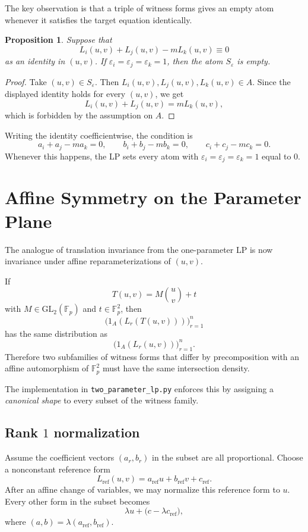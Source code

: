 \documentclass[11pt]{article}
\newtheorem{proposition}{Proposition}
\begin{document}
The key observation is that a triple of witness forms gives an empty atom whenever
it satisfies the target equation identically.

\begin{proposition}
Suppose that
\[
L_i(u,v)+L_j(u,v)-mL_k(u,v)\equiv 0
\]
as an identity in $(u,v)$. If $\varepsilon_i=\varepsilon_j=\varepsilon_k=1$,
then the atom $S_{\varepsilon}$ is empty.
\end{proposition}

\begin{proof}
Take $(u,v) \in S_{\varepsilon}$. Then $L_i(u,v),L_j(u,v),L_k(u,v)\in A$.
Since the displayed identity holds for every $(u,v)$, we get
\[
L_i(u,v)+L_j(u,v)=mL_k(u,v),
\]
which is forbidden by the assumption on $A$.
\end{proof}

Writing the identity coefficientwise, the condition is
\[
a_i+a_j-ma_k=0,\qquad
b_i+b_j-mb_k=0,\qquad
c_i+c_j-mc_k=0.
\]
Whenever this happens, the LP sets every atom with
$\varepsilon_i=\varepsilon_j=\varepsilon_k=1$ equal to $0$.

\section{Affine Symmetry on the Parameter Plane}

The analogue of translation invariance from the one-parameter LP is now invariance
under affine reparameterizations of $(u,v)$.

If
\[
T(u,v)=M\binom{u}{v}+t
\]
with $M \in \mathrm{GL}_2(\mathbb{F}_p)$ and $t \in \mathbb{F}_p^2$, then
\[
\bigl(1_A(L_r(T(u,v)))\bigr)_{r=1}^n
\]
has the same distribution as
\[
\bigl(1_A(L_r(u,v))\bigr)_{r=1}^n.
\]
Therefore two subfamilies of witness forms that differ by precomposition with an
affine automorphism of $\mathbb{F}_p^2$ must have the same intersection density.

The implementation in \texttt{two\_parameter\_lp.py} enforces this by assigning a
\emph{canonical shape} to every subset of the witness family.

\subsection*{Rank $1$ normalization}

Assume the coefficient vectors $(a_r,b_r)$ in the subset are all proportional.
Choose a nonconstant reference form
\[
L_{\mathrm{ref}}(u,v)=a_{\mathrm{ref}}u+b_{\mathrm{ref}}v+c_{\mathrm{ref}}.
\]
After an affine change of variables, we may normalize this reference form to $u$.
Every other form in the subset becomes
\[
\lambda u + \bigl(c-\lambda c_{\mathrm{ref}}\bigr),
\]
where $(a,b)=\lambda(a_{\mathrm{ref}},b_{\mathrm{ref}})$.
\end{document}
